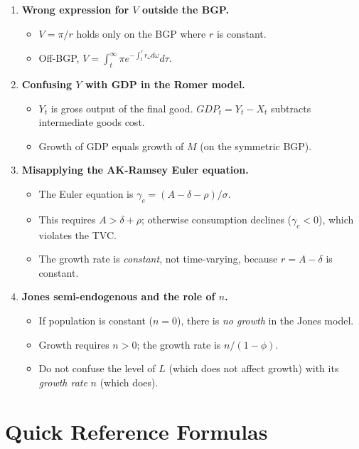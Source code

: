 \documentclass[a4paper,11pt]{article}
\begin{document}
\begin{enumerate}
    \item \textbf{Wrong expression for $V$ outside the BGP.}
    \begin{itemize}
        \item $V = \pi/r$ holds only on the BGP where $r$ is constant.
        \item Off-BGP, $V = \int_t^\infty \pi e^{-\int_t^\tau r_\omega d\omega} d\tau$.
    \end{itemize}

    \item \textbf{Confusing $Y$ with GDP in the Romer model.}
    \begin{itemize}
        \item $Y_t$ is gross output of the final good. $GDP_t = Y_t - X_t$ subtracts intermediate goods cost.
        \item Growth of GDP equals growth of $M$ (on the symmetric BGP).
    \end{itemize}

    \item \textbf{Misapplying the AK-Ramsey Euler equation.}
    \begin{itemize}
        \item The Euler equation is $\gamma_c = (A - \delta - \rho)/\sigma$.
        \item This requires $A > \delta + \rho$; otherwise consumption declines ($\gamma_c < 0$), which violates the TVC.
        \item The growth rate is \emph{constant}, not time-varying, because $r = A - \delta$ is constant.
    \end{itemize}

    \item \textbf{Jones semi-endogenous and the role of $n$.}
    \begin{itemize}
        \item If population is constant ($n = 0$), there is \emph{no growth} in the Jones model.
        \item Growth requires $n > 0$; the growth rate is $n/(1-\phi)$.
        \item Do not confuse the level of $L$ (which does not affect growth) with its \emph{growth rate} $n$ (which does).
    \end{itemize}
\end{enumerate}

\clearpage

\section{Quick Reference Formulas}
\end{document}
